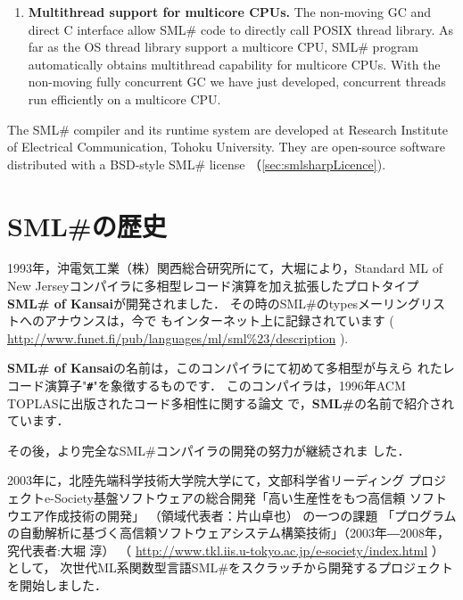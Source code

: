 \documentclass{jbook}
\newif\ifjp
\newcommand{\txt}[2]{#1}
\newcommand{\smlsharp}{SML\#}
\newcommand{\code}[1]{\mbox{\large\tt #1}}
\begin{document}
\begin{enumerate}
\item {\bf Multithread support for multicore CPUs.}
	The non-moving GC \cite{ueno11icfp} and direct C interface allow
\smlsharp{} code to directly call POSIX thread library.
	As far as the OS thread library support a multicore CPU,
\smlsharp{} program automatically obtains multithread capability for
multicore CPUs.
	With the non-moving fully concurrent GC we have just developed, 
concurrent threads run efficiently on a multicore CPU.

\end{enumerate}

	The \smlsharp{} compiler and its runtime system are developed at
Research Institute of Electrical Communication,  Tohoku University.
	They are open-source software distributed with a BSD-style
\smlsharp{} license （\ref{sec:smlsharpLicence}).
\fi%

\section{\txt{\smlsharp{}の歴史}{History of \smlsharp{}}}
\label{sec:smlsharpHistory}

\ifjp%
	1993年，沖電気工業（株）関西総合研究所にて，大堀により，Standard
ML of New Jerseyコンパイラに多相型レコード演算を加え拡張したプロトタイプ
{\bf SML\# of Kansai}が開発されました．
	その時の\smlsharp{}のtypesメーリングリストへのアナウンスは，今で
もインターネット上に記録されています
(
\url{http://www.funet.fi/pub/languages/ml/sml%23/description}
).

	{\bf SML\# of Kansai}の名前は，このコンパイラにて初めて多相型が与えら
れたレコード演算子"{\bf \code{\#}}"を象徴するものです．
	このコンパイラは，1996年ACM TOPLASに出版されたコード多相性に関する論文
\cite{ohor95toplas}で，{\bf \smlsharp{}}の名前で紹介されています．

	その後，より完全な\smlsharp{}コンパイラの開発の努力が継続されま
した．

	2003年に，北陸先端科学技術大学院大学にて，文部科学省リーディング
プロジェクトe-Society基盤ソフトウェアの総合開発「高い生産性をもつ高信頼
ソフトウエア作成技術の開発」
（領域代表者：片山卓也）
の一つの課題
「プログラムの自動解析に基づく高信頼ソフトウェアシステム構築技術」（2003年―2008年，究代表者:大堀 淳）
（
\url{http://www.tkl.iis.u-tokyo.ac.jp/e-society/index.html}
）
として，
次世代ML系関数型言語\smlsharp{}をスクラッチから開発するプロジェクトを開始しました．
\end{document}
